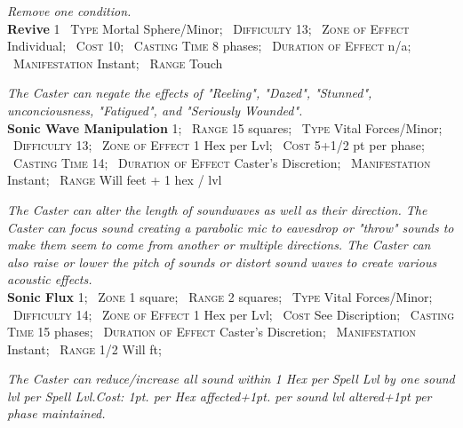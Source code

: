 \documentclass[11pt]{article}
\newcommand{\spell}[1]{{\sc\bfseries\large #1}}
\begin{document}
\noindent\textsl{Remove one condition.}
%
\\[6pt]
%
\spell{Revive} 1
\ \textsc{Type} Mortal Sphere/Minor;
\ \textsc{Difficulty} 13;
\ \textsc{Zone of Effect} Individual;
\ \textsc{Cost} 10;
\ \textsc{Casting Time} 8 phases;
\ \textsc{Duration of Effect} n/a;
\ \textsc{Manifestation} Instant;
\ \textsc{Range} Touch

\noindent\textsl{The Caster can negate the effects of "Reeling",
  "Dazed", "Stunned", unconciousness, "Fatigued", and "Seriously
  Wounded".}
%
\\[6pt]
%
\spell{Sonic Wave Manipulation} 1;
\ \textsc{Range} 15 squares;
\ \textsc{Type} Vital Forces/Minor;
\ \textsc{Difficulty} 13;
\ \textsc{Zone of Effect} 1 Hex per Lvl;
\ \textsc{Cost} 5+1/2 pt per phase;
\ \textsc{Casting Time}	14;
\ \textsc{Duration of Effect} Caster's Discretion;
\ \textsc{Manifestation} Instant;
\ \textsc{Range} Will feet + 1 hex / lvl

\noindent\textsl{The Caster can alter the length of soundwaves as well as their
direction. The Caster can focus sound creating a parabolic mic to
eavesdrop or "throw" sounds to make them seem to come from another or
multiple directions. The Caster can also raise or lower the pitch of
sounds or distort sound waves to create various acoustic effects.}
%
\\[6pt]
%
\spell{Sonic Flux} 1;
\ \textsc{Zone} 1 square;
\ \textsc{Range} 2 squares;
\ \textsc{Type} Vital Forces/Minor;
\ \textsc{Difficulty} 14;
\ \textsc{Zone of Effect} 1 Hex per Lvl;
\ \textsc{Cost} See Discription;
\ \textsc{Casting Time} 15 phases;
\ \textsc{Duration of Effect} Caster's Discretion;
\ \textsc{Manifestation} Instant;
\ \textsc{Range} 1/2 Will ft;

\noindent\textsl{The Caster can reduce/increase all sound within 1 Hex per Spell Lvl by
one sound lvl per Spell Lvl.Cost: 1pt. per Hex affected+1pt. per sound
lvl altered+1pt per phase maintained.}

\end{document}

